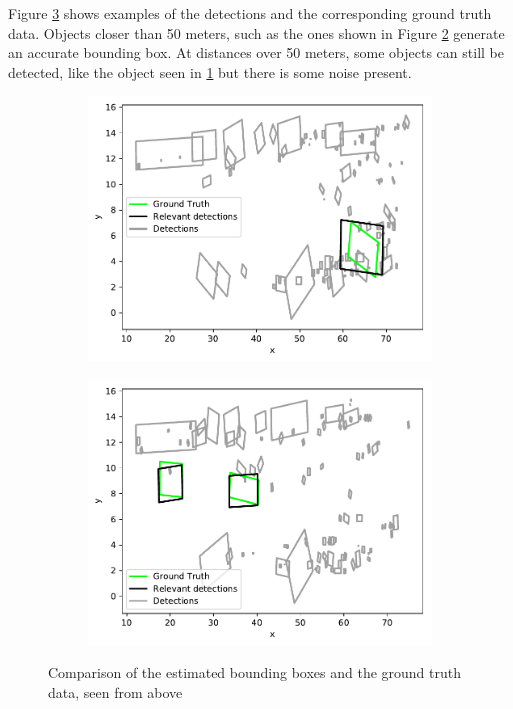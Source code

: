 Figure \ref{fig:eval:iouLehr} shows examples of the detections and the corresponding ground truth data. Objects closer than 50 meters, such as the ones shown in Figure \ref{fig:eval:iouLehr:2} generate an accurate bounding box. At distances over 50 meters, some objects can still be detected, like the object seen in \ref{fig:eval:iouLehr:1} but there is some noise present.

\begin{figure}[h!]
    \centering
    \begin{subfigure}[c]{0.75\textwidth}
        \includegraphics[width=\textwidth]{../Material/lehr1.pdf}
        \subcaption{}
        \label{fig:eval:iouLehr:1}
    \end{subfigure}
    \begin{subfigure}[c]{0.75\textwidth}
        \includegraphics[width=\textwidth]{../Material/lehr2.pdf}
        \subcaption{}
        \label{fig:eval:iouLehr:2}
    \end{subfigure}
    \caption{Comparison of the estimated bounding boxes and the ground truth data, seen from above}
    \label{fig:eval:iouLehr}
\end{figure}

